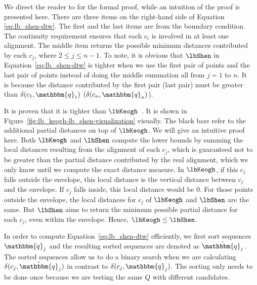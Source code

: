 We direct the reader to \cite{shen2017searching} for the formal proof, while an intuition of the proof is presented here.
There are three items on the right-hand side of Equation \ref{eq:lb_shen-dtw}.
The first and the last items are from the boundary condition.
The continuity requirement ensures that each $c_i$ is involved in at least one alignment.
The middle item returns the possible minimum distances contributed by each $c_j$, where $2 \leq j \leq n-1$.
To note, it is obvious that $\lbShen$ in Equation~\ref{eq:lb_shen-dtw} is tighter when we use the first pair of points and the last pair of points instead of doing the middle summation all from $j=1$ to $n$.
It is because the distance contributed by the first pair (last pair) must be greater than $\delta(c_1, \mathbbm{q}_1)$ ($\delta(c_n, \mathbbm{q}_n)$).

It is proven that it is tighter than $\lbKeogh$~\cite{shen2017searching}.
It is shown in Figure~\ref{fig:lb_keogh-lb_shen-visualization} visually.
The black bars refer to the additional partial distances on top of $\lbKeogh$.
%
We will give an intuitive proof here.
Both $\lbKeogh$ and $\lbShen$ compute the lower bounds by summing the local distances resulting from the alignment of each $c_j$, which is guaranteed not to be greater than the partial distance contributed by the real alignment, which we only know until we compute the exact distance measure.
In $\lbKeogh$,  if this $c_j$ falls outside the envelope, this local distance is the vertical distance between $c_j$ and the envelope.
If $c_j$ falls inside, this local distance would be 0.
For those points outside the envelope, the local distances for $c_j$ of $\lbKeogh$ and $\lbShen$ are the same.
But $\lbShen$ aims to return the minimum possible partial distance for each $c_j$, even within the envelope.
Hence, $\lbKeogh \leq \lbShen$.

In order to compute Equation~\ref{eq:lb_shen-dtw} efficiently, we first sort sequences $\mathbbm{q}_j$ and the resulting sorted sequences are denoted as $\tilde{\mathbbm{q}_j}$. 
The sorted sequences allow us to do a binary search when we are calculating $\delta(c_j, \tilde{\mathbbm{q}}_j)$ in contrast to $\delta(c_j, \mathbbm{q}_j)$. The sorting only needs to be done once because we are testing the same $Q$ with different candidates.

